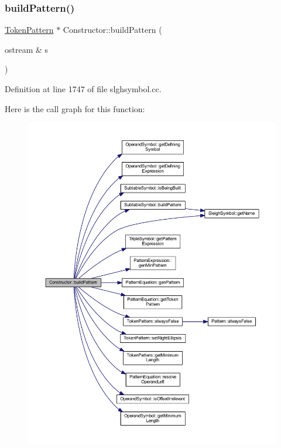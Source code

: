 \subsubsection{\texorpdfstring{buildPattern()}{buildPattern()}}
{\footnotesize\ttfamily \mbox{\hyperlink{class_token_pattern}{Token\+Pattern}} $\ast$ Constructor\+::build\+Pattern (\begin{DoxyParamCaption}\item[{ostream \&}]{s }\end{DoxyParamCaption})}



Definition at line 1747 of file slghsymbol.\+cc.

Here is the call graph for this function\+:
\nopagebreak
\begin{figure}[H]
\begin{center}
\leavevmode
\includegraphics[width=350pt]{class_constructor_a9c900244b8b33d73688c077a0f360812_cgraph}
\end{center}
\end{figure}
\mbox{\label{class_constructor_aacdb7792f4b1b7cb3e2ed2ce18ad48e8}} 
